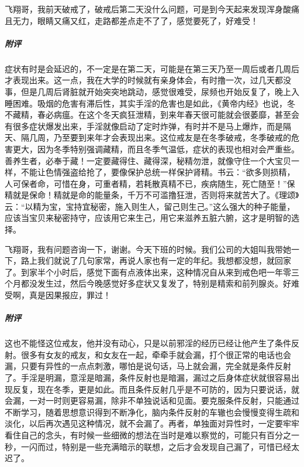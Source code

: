\begin{case}
    飞翔哥，我前天破戒了，破戒后第二天没什么问题，可是到今天起来发现浑身酸痛且无力，眼睛又痛又红，走路都差点走不了了，感觉要死了，好难受！
    \subparagraph{附评} 症状有时是会延迟的，不一定是在第二天，可能是在第三天乃至一周后或者几周后才表现出来。这一点，我在大学的时候就有亲身体会，有时撸一次，过几天都没事，但是几周后肾脏就开始突突地跳动，感觉很难受，尿频也开始反复了，晚上入睡困难。吸烟的危害有滞后性，其实手淫的危害也是如此，《黄帝内经》也说，冬不藏精，春必病瘟。在这个冬天疯狂泄精，到来年春天很可能就会很萎靡，甚至会有很多症状爆发出来，手淫就像启动了定时炸弹，有时并不是马上爆炸，而是隔天、隔几周，乃至要到来年才会表现出来。这位戒友是在冬季破戒，冬季破戒的危害更大，因为冬季特别强调藏精，而且冬季气温低，症状的表现也相对会严重些。善养生者，必奉于藏！一定要藏得住、藏得深，秘精勿泄，就像守住一个大宝贝一样，不能让色情强盗给抢了，要像保护总统一样保护肾精。书云：“欲多则损精，人可保者命，可惜在身，可重者精，若耗散真精不已，疾病随生，死亡随至！”保精就是保命！精就是命的能量条，千万不可滥撸狂泄，否则将来就苦大了。《理颂》云：“以精为宝，宝持宜秘密，施入则生人，留己则生己。”这么强大的种子能量，应该当宝贝来秘密持守，应该用它来生己，用它来滋养五脏六腑，这才是明智的选择。
\end{case}

\begin{case}
    飞翔哥，我有问题咨询一下，谢谢。今天下班的时候。我们公司的大姐叫我带她一下，路上我们就说了几句家常，再说人家也有一定的年纪。我想都没想，就回家了。到家半个小时后，感觉下面有点液体出来，这种情况自从来到戒色吧一年零三个月都没发生过，然后今晚感觉好多症状又复发了，特别是精索和前列腺炎。好难受啊，真是因果报应，罪过！
    \subparagraph{附评} 这也不能怪这位戒友，他并没有动心，只是以前邪淫的经历已经让他产生了条件反射。很多有女友的戒友，和女友在一起，牵牵手就会漏，打个很正常的电话也会漏，只要有异性的一点点刺激，哪怕是说句话，马上就会漏，完全就是条件反射了。手淫是明漏，意淫是暗漏，条件反射也是暗漏，漏过之后身体症状就很容易出现反复，现在冬季，更是如此。而且条件反射几乎是不可防的，因为只要说话，就会漏，一对一时则更容易漏，除非不单独说话和见面。要克服条件反射，只能通过不断学习，随着思想意识得到不断净化，脑内条件反射的车辙也会慢慢变得生疏和淡化，以后再次遇见这种情况，就不会漏了。再者，单独面对异性时，一定要牢牢看住自己的念头，有时候一些细微的想法在当时是难以察觉的，可能只有百分之一秒，一闪而过，特别是一些充满暗示的联想，之后才会发现自己漏了，可惜已经太迟了。
\end{case}

